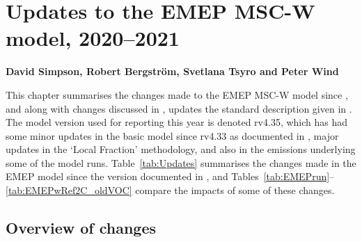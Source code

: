 \chapter[Model updates]{Updates to the EMEP MSC-W model, 2020--2021}
\label{ch:ModelUpdates}


{\bf{David Simpson, Robert Bergstr\"om, Svetlana Tsyro and Peter Wind}}
\vspace{30pt}


This chapter summarises the changes made to the EMEP MSC-W  model
since \citet{R2019:ModDev}, and along with changes discussed in
\citet{R2013:ModDev,R2014:ModDev,R2015:ModDev,R2016:ModDev,R2017:ModDev,R2019:ModDev},
updates the standard description given in \citet{Simpson_et_al:EMEP}. The
model version used for reporting this year is denoted rv4.35, which has
had some minor updates in the basic model since rv4.33 as documented
in  \citet{R2019:ModDev}, major updates in the `Local Fraction'
methodology, and also in the emissions underlying some of the model runs. Table~\ref{tab:Updates} summarises
the changes made in the EMEP model since the version documented in
\citet{Simpson_et_al:EMEP}, and Tables~\ref{tab:EMEPrun}--\ref{tab:EMEPwRef2C_oldVOC} compare the impacts of some of these changes.

%

\section{Overview of changes} 

